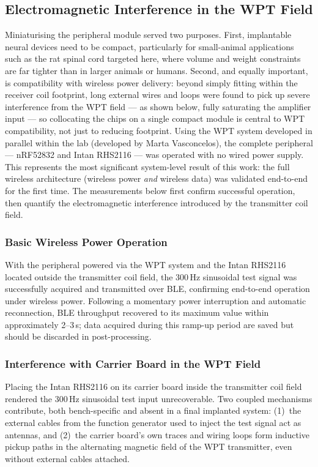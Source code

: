 \subsection{Electromagnetic Interference in the WPT Field}
\label{sec:results_noise}

Miniaturising the peripheral module served two purposes. First, implantable
neural devices need to be compact, particularly for small-animal applications
such as the rat spinal cord targeted here, where volume and weight constraints
are far tighter than in larger animals or humans. Second, and equally important, is
compatibility with wireless power delivery: beyond simply fitting within the
receiver coil footprint, long external wires and loops were found to pick up
severe interference from the WPT field --- as shown below, fully saturating the
amplifier input --- so collocating the chips on a single compact module is
central to WPT compatibility, not just to reducing footprint. Using the WPT system developed in
parallel within the lab (developed by Marta Vasconcelos), the complete peripheral --- nRF52832 and
Intan RHS2116 --- was operated with no wired power supply. This represents the
most significant system-level result of this work: the full wireless architecture
(wireless power \emph{and} wireless data) was validated end-to-end for the first
time. The measurements below first confirm successful operation, then quantify the
electromagnetic interference introduced by the transmitter coil field.

\subsubsection*{Basic Wireless Power Operation}

With the peripheral powered via the WPT system and the Intan RHS2116 located
outside the transmitter coil field, the 300\,Hz sinusoidal test signal was
successfully acquired and transmitted over BLE, confirming end-to-end operation
under wireless power. Following a momentary power interruption and automatic
reconnection, BLE throughput recovered to its maximum value within approximately
2--3\,s; data acquired during this ramp-up period are saved but should be
discarded in post-processing.

\subsubsection*{Interference with Carrier Board in the WPT Field}

Placing the Intan RHS2116 on its carrier board inside the transmitter coil field
rendered the 300\,Hz sinusoidal test input unrecoverable. Two coupled mechanisms
contribute, both bench-specific and absent in a final implanted system:
(1)~the external cables from the function generator used to inject the test signal
act as antennas, and (2)~the carrier board's own traces and wiring loops form
inductive pickup paths in the alternating magnetic field of the WPT transmitter,
even without external cables attached.

